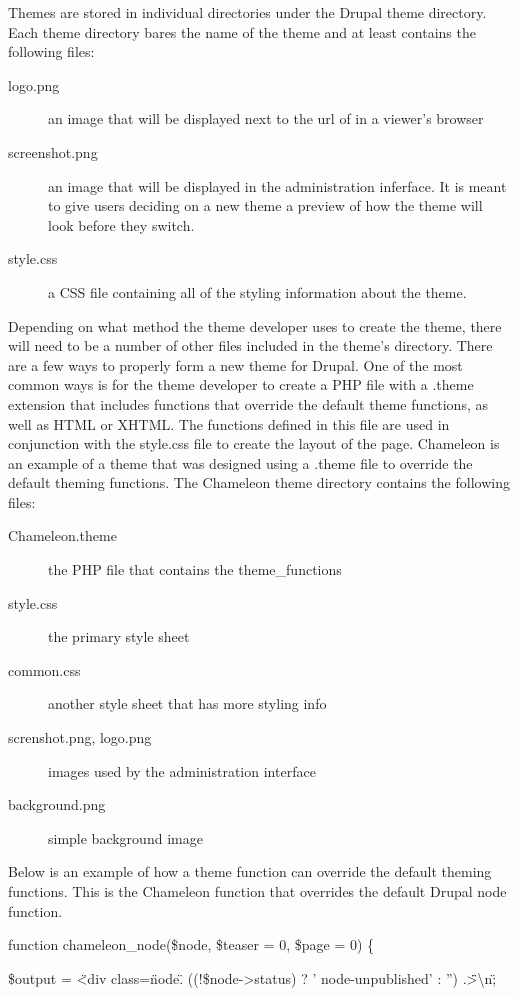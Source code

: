 \documentclass[a4paper,12pt]{report}
\begin{document}
Themes are stored in individual directories under the Drupal theme directory. 
Each theme directory bares the name of the theme and at least contains the following files:
\begin{description}
\item[logo.png] an image that will be displayed next to the url of in a viewer's browser
\item[screenshot.png] an image that will be displayed in the administration inferface. 
It is meant to give users deciding on a new theme a preview of how the theme will look before they switch. 
\item[style.css] a CSS file containing all of the styling information about the theme. 
\end{description}


Depending on what method the theme developer uses to create the theme, there will need to be a number of other files included in the theme's directory. 
There are a few ways to properly form a new theme for Drupal. 
One of the most common ways is for the theme developer to create a PHP file with a .theme extension that includes functions that override the default theme functions, as well as HTML or XHTML. 
The functions defined in this file are used in conjunction with the style.css file to create the layout of the page. 
Chameleon is an example of a theme that was designed using a .theme file to override the default theming functions.
The Chameleon theme directory contains the following files: 
\begin{description}
\item[Chameleon.theme] the PHP file that contains the theme\_functions 
\item[style.css] the primary style sheet
\item[common.css] another style sheet that has more styling info
\item[screnshot.png, logo.png] images used by the administration interface
\item[background.png] simple background image
\end{description}

Below is an example of how a theme function can override the default theming functions. 
This is the Chameleon function that overrides the default Drupal node function.

function chameleon\_node(\$node, \$teaser = 0, \$page = 0) \{

  \$output  = \"<div class=\"node\". ((!\$node->status) ? ' node-unpublished' : '') .\"\">\textbackslash n\";
\end{document}
